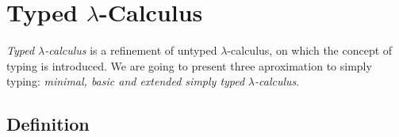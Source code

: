 






 
\section{Typed $\lambda$-Calculus}
\emph{Typed $\lambda$-calculus} is a refinement of untyped $\lambda$-calculus, on which the concept of typing is introduced. We are going to present three aproximation to simply typing: \emph{minimal, basic and extended simply typed }$\lambda$\emph{-calculus}. 

\subsection{Definition}


